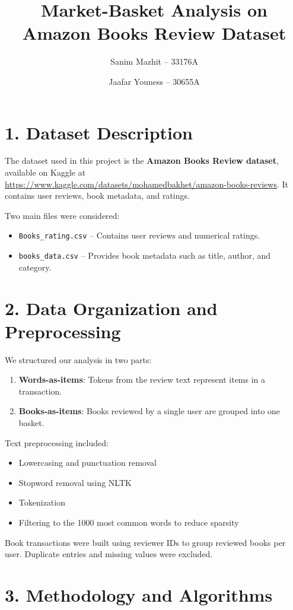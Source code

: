 \documentclass{article}
\title{Market-Basket Analysis on Amazon Books Review Dataset}
\author{Sanim Mazhit -- 33176A \and Jaafar Youness -- 30655A}
\date{}
\begin{document}
\maketitle

\section*{1. Dataset Description}

The dataset used in this project is the \textbf{Amazon Books Review dataset}, available on Kaggle at \url{https://www.kaggle.com/datasets/mohamedbakhet/amazon-books-reviews}. It contains user reviews, book metadata, and ratings.

Two main files were considered:
\begin{itemize}
    \item \texttt{Books\_rating.csv} -- Contains user reviews and numerical ratings.
    \item \texttt{books\_data.csv} -- Provides book metadata such as title, author, and category.
\end{itemize}

\section*{2. Data Organization and Preprocessing}

We structured our analysis in two parts:
\begin{enumerate}
    \item \textbf{Words-as-items}: Tokens from the review text represent items in a transaction.
    \item \textbf{Books-as-items}: Books reviewed by a single user are grouped into one basket.
\end{enumerate}

Text preprocessing included:
\begin{itemize}
    \item Lowercasing and punctuation removal
    \item Stopword removal using NLTK
    \item Tokenization
    \item Filtering to the 1000 most common words to reduce sparsity
\end{itemize}

Book transactions were built using reviewer IDs to group reviewed books per user. Duplicate entries and missing values were excluded.

\section*{3. Methodology and Algorithms}
\end{document}
